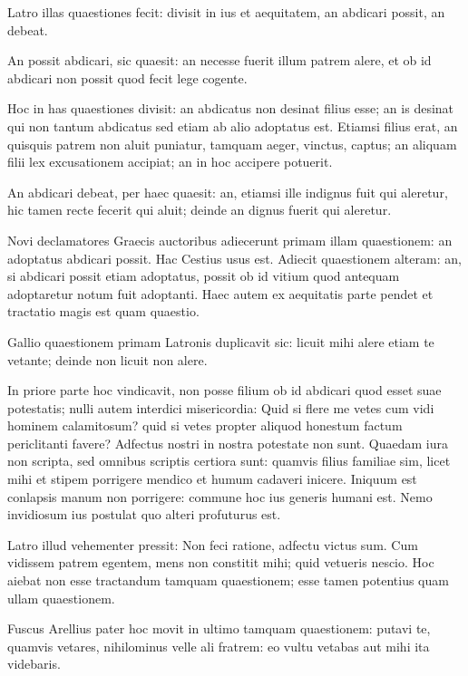 \bigskip

Latro illas quaestiones fecit: divisit in ius et aequitatem, an abdicari possit, an debeat. 

An possit abdicari, sic quaesit: an necesse fuerit illum patrem alere, et ob id abdicari non possit quod fecit lege cogente. 

Hoc in has quaestiones divisit: an abdicatus non desinat filius esse; an is desinat qui non tantum abdicatus sed etiam ab alio adoptatus est. Etiamsi filius erat, an quisquis patrem non aluit puniatur, tamquam aeger, vinctus, captus; an aliquam filii lex excusationem accipiat; an in hoc accipere potuerit. 

An abdicari debeat, per haec quaesit: an, etiamsi ille indignus fuit qui aleretur, hic tamen recte fecerit qui aluit; deinde an dignus fuerit qui aleretur.

\bigskip 	

Novi declamatores Graecis auctoribus adiecerunt primam illam quaestionem: an adoptatus abdicari possit. Hac Cestius usus est. Adiecit quaestionem alteram: an, si abdicari possit etiam 	
adoptatus, possit ob id vitium quod antequam adoptaretur notum fuit adoptanti. Haec autem ex aequitatis parte pendet et tractatio magis est quam quaestio.

\bigskip

Gallio quaestionem primam Latronis duplicavit sic: licuit mihi alere etiam te vetante; deinde non licuit non alere. 

In priore parte hoc vindicavit, non posse filium ob id abdicari quod esset suae potestatis; nulli autem interdici misericordia: Quid si flere me vetes cum vidi hominem calamitosum? quid si vetes propter aliquod honestum factum periclitanti favere? Adfectus nostri in nostra potestate non sunt. Quaedam iura non scripta, sed omnibus scriptis certiora sunt: quamvis filius familiae sim, licet mihi et stipem porrigere mendico et humum cadaveri inicere. Iniquum est conlapsis manum non porrigere: commune hoc ius generis humani est. Nemo invidiosum ius postulat quo alteri profuturus est. 

\bigskip	

Latro illud vehementer pressit: Non feci ratione, adfectu victus sum. Cum vidissem patrem egentem, mens non constitit mihi; quid vetueris nescio. Hoc aiebat non esse tractandum tamquam quaestionem; esse tamen potentius quam ullam quaestionem.

Fuscus Arellius pater hoc movit in ultimo tamquam quaestionem: putavi te, quamvis vetares, nihilominus velle ali fratrem: eo vultu vetabas aut mihi ita videbaris. 	

